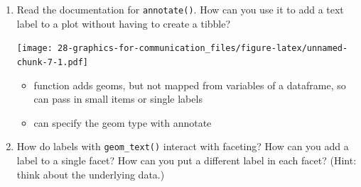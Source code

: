 \documentclass[]{book}
\newenvironment{Shaded}{\begin{snugshade}}{\end{snugshade}}
\newcommand{\DataTypeTok}[1]{\textcolor[rgb]{0.13,0.29,0.53}{#1}}
\newcommand{\KeywordTok}[1]{\textcolor[rgb]{0.13,0.29,0.53}{\textbf{#1}}}
\newcommand{\NormalTok}[1]{#1}
\newcommand{\OperatorTok}[1]{\textcolor[rgb]{0.81,0.36,0.00}{\textbf{#1}}}
\newcommand{\OtherTok}[1]{\textcolor[rgb]{0.56,0.35,0.01}{#1}}
\newcommand{\StringTok}[1]{\textcolor[rgb]{0.31,0.60,0.02}{#1}}
\providecommand{\tightlist}{%
  \setlength{\itemsep}{0pt}\setlength{\parskip}{0pt}}
\theoremstyle{definition}
\theoremstyle{definition}
\theoremstyle{definition}
\theoremstyle{remark}
\begin{document}
\begin{enumerate}
\def\labelenumi{\arabic{enumi}.}
\item
  Read the documentation for \texttt{annotate()}. How can you use it to
  add a text label to a plot without having to create a tibble?

\begin{Shaded}
\end{Shaded}

  \texttt{[image: 28-graphics-for-communication\_files/figure-latex/unnamed-chunk-7-1.pdf]}

  \begin{itemize}
  \tightlist
  \item
    function adds geoms, but not mapped from variables of a dataframe,
    so can pass in small items or single labels
  \item
    can specify the geom type with annotate
  \end{itemize}
\item
  How do labels with \texttt{geom\_text()} interact with faceting? How
  can you add a label to a single facet? How can you put a different
  label in each facet? (Hint: think about the underlying data.)


\end{enumerate}
\end{document}
